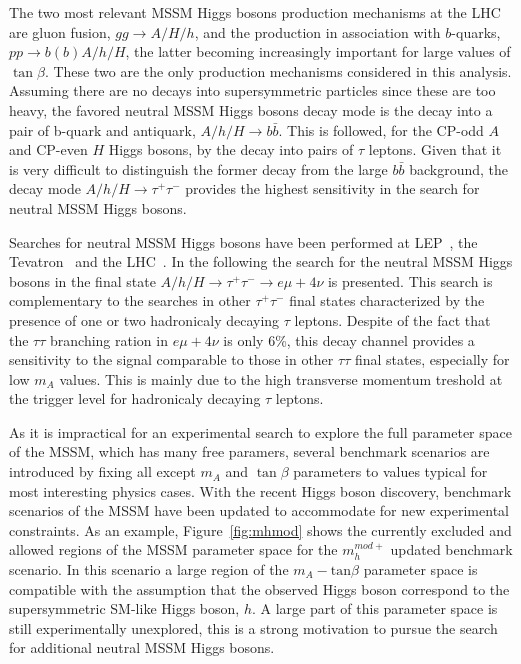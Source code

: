 The two most relevant MSSM Higgs bosons production mechanisms 
at the LHC are gluon fusion, $gg\rightarrow A/H/h$, and 
the production in association with $b$-quarks, $pp \rightarrow b(b)A/h/H$, the latter becoming increasingly 
important for large values of $\tan\beta$. These two are the only production mechanisms
considered in this analysis. 
Assuming there are no decays into supersymmetric particles since these are too heavy, 
the favored neutral MSSM Higgs bosons decay mode  is the decay into a pair of b-quark and antiquark,
$A/h/H \rightarrow b\bar{b}$. This is followed, for the CP-odd $A$ and CP-even $H$ Higgs bosons, 
by the decay into pairs of $\tau$ leptons. Given that it is very difficult to distinguish the former decay 
from the large $b\bar{b}$ background, the decay mode 
$A/h/H \rightarrow \tau^+ \tau^-$  provides the highest sensitivity in the search for neutral MSSM Higgs bosons.

Searches for neutral MSSM Higgs bosons have been performed at
LEP~\cite{LEPLimits}, the
Tevatron~\cite{TevatronLimits1} and the LHC~\cite{CMSLimit, ATLASLimit}. 
In the following the search for the neutral MSSM Higgs bosons  in the final state 
$A/h/H \rightarrow \tau^+ \tau^- \rightarrow e \mu +4\nu$ is presented. 
This search is complementary to the searches in other $\tau^+\tau^-$ final states
characterized by the presence of one or two hadronicaly decaying $\tau$ leptons. Despite of the fact that the 
$\tau\tau$ branching ration in $e \mu +4\nu$ is only 6\%, this decay channel provides a sensitivity 
to the signal comparable to those in other $\tau\tau$ final states, especially for low $m_A$ values. 
This is mainly due to the high transverse momentum treshold at the trigger level for  hadronicaly decaying $\tau$ leptons.

As it is impractical for an experimental  search to explore the full parameter space of the MSSM, 
which has many free paramers, several benchmark scenarios are  
introduced by fixing all except $m_A$ and $\tan\beta$ parameters to values typical for most interesting 
physics cases.
With the recent Higgs boson discovery, benchmark scenarios of the MSSM have been updated to 
accommodate for  new experimental constraints. 
As an example, Figure~\ref{fig:mhmod} shows the currently excluded and allowed regions of the MSSM parameter space
for the  $m_{h}^{mod+}$ updated benchmark scenario. In this scenario a large region of the $m_{A} - \text{tan}\beta$
parameter space is compatible with the assumption that the observed Higgs boson correspond to the supersymmetric
SM-like Higgs boson, $h$. A large part of this parameter space is still experimentally unexplored,
this is a strong motivation to pursue the search for additional neutral MSSM Higgs bosons.


